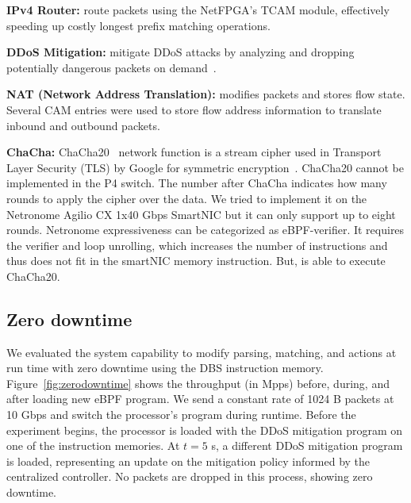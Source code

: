 \textbf{IPv4 Router:} route packets using the NetFPGA's TCAM module, effectively speeding up costly longest prefix matching operations. 

\textbf{DDoS Mitigation:} mitigate DDoS attacks by analyzing and dropping potentially dangerous packets on demand~\cite{Bertin2017}.

\textbf{NAT (Network Address Translation):} modifies packets and stores flow state. Several CAM entries were used to store flow address information to translate inbound and outbound packets.



\textbf{ChaCha:} 
ChaCha20~\cite{rfc8439} network function is a
stream cipher used in Transport Layer Security (TLS) by Google for symmetric
encryption~\cite{google-chacha}.
ChaCha20 cannot be implemented in the P4 switch.
The number after ChaCha indicates how many rounds to apply the cipher over the data.
We tried to implement it on the Netronome Agilio CX 1x40 Gbps SmartNIC but it can only support up to eight rounds. Netronome expressiveness can be categorized as eBPF-verifier. It requires the verifier and loop unrolling, which increases the number of instructions and thus does not fit in the smartNIC memory instruction.
But, \system is able to execute ChaCha20.

\subsection{Zero downtime}
\label{sec:downtime}

We evaluated the system capability to modify parsing, matching, and actions at run time with zero downtime using the DBS instruction memory. Figure~\ref{fig:zerodowntime} shows the throughput (in Mpps) before, during, and after loading new eBPF program. We send a constant rate of 1024 B packets at 10 Gbps and switch the processor's program during runtime. Before the experiment begins, the processor is loaded with the DDoS mitigation program on one of the instruction memories. At $t=5$ s, a different DDoS mitigation program is loaded, representing an update on the mitigation policy informed by the centralized controller. 
No packets are dropped in this process, showing zero downtime.

